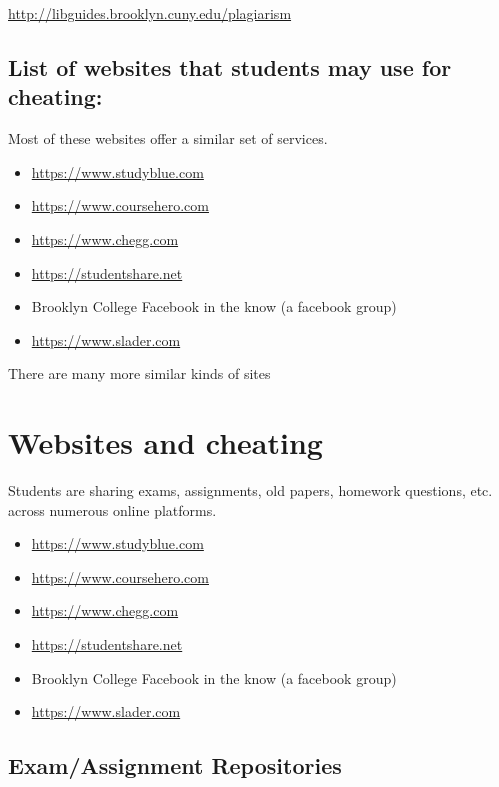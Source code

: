 \documentclass[]{book}
\providecommand{\tightlist}{%
  \setlength{\itemsep}{0pt}\setlength{\parskip}{0pt}}
\theoremstyle{definition}
\theoremstyle{definition}
\theoremstyle{definition}
\theoremstyle{remark}
\begin{document}
\url{http://libguides.brooklyn.cuny.edu/plagiarism}

\section{List of websites that students may use for
cheating:}\label{list-of-websites-that-students-may-use-for-cheating}

Most of these websites offer a similar set of services.

\begin{itemize}
\tightlist
\item
  \url{https://www.studyblue.com}
\item
  \url{https://www.coursehero.com}
\item
  \url{https://www.chegg.com}
\item
  \url{https://studentshare.net}
\item
  Brooklyn College Facebook in the know (a facebook group)
\item
  \url{https://www.slader.com}
\end{itemize}

There are many more similar kinds of sites

\chapter{Websites and cheating}\label{websites-and-cheating}

Students are sharing exams, assignments, old papers, homework questions,
etc. across numerous online platforms.

\begin{itemize}
\tightlist
\item
  \url{https://www.studyblue.com}
\item
  \url{https://www.coursehero.com}
\item
  \url{https://www.chegg.com}
\item
  \url{https://studentshare.net}
\item
  Brooklyn College Facebook in the know (a facebook group)
\item
  \url{https://www.slader.com}
\end{itemize}

\section{Exam/Assignment
Repositories}\label{examassignment-repositories}
\end{document}
